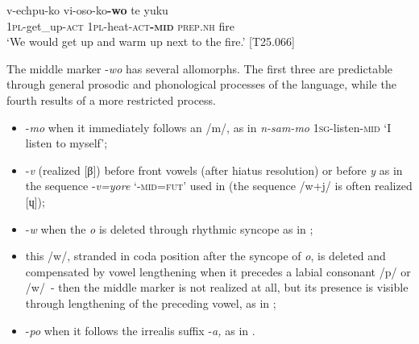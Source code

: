 \documentclass[output=paper]{langscibook}
\begin{document}
\ea
\label{ex:Rose:10}
\gll v-echpu-ko vi-oso-ko\textbf{-wo} te yuku\\
1\textsc{pl}-get\_up-\textsc{act} \textsc{1pl}-heat-\textsc{act\textbf{-mid}} \textsc{prep.nh} fire\\
\glt ‘We would get up and warm up next to the fire.’ [T25.066]
\z


The middle marker -\textit{wo} has several allomorphs. The first three are predictable through general prosodic and phonological processes of the language, while the fourth results of a more restricted process.


\begin{itemize}
\item -\textit{mo} when it immediately follows an /m/, as in \textit{n-sam-mo} 1\textsc{sg}-listen-\textsc{mid} ‘I listen to myself’;

\item -\textit{v} (realized [β]) before front vowels (after hiatus resolution) or before \textit{y} as in the sequence -\textit{v=yore} ‘-\textsc{mid=fut}’ used in  (the sequence /w+j/ is often realized [ɥ]);

\item -\textit{w} when the \textit{o} is deleted through rhythmic syncope as in ;

\item this /w/, stranded in coda position after the syncope of \textit{o}, is deleted and compensated by vowel lengthening when it precedes a labial consonant /p/ or /w/~- then the middle marker is not realized at all, but its presence is visible through lengthening of the preceding vowel, as in ;

\item -\textit{po }when it follows the irrealis suffix -\textit{a,} as in .

\end{itemize}
\end{document}
